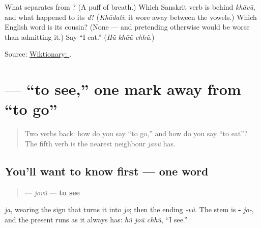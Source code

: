 \begin{tcolorbox}[breakable,colback=teal!4,colframe=teal!35!black,title={Before you move on}]
What separates \textbf{} from \textbf{}? (A puff of breath.) Which Sanskrit verb is behind \emph{khāvũ}, and what happened to its \emph{d}? (\emph{Khādati}; it wore away between the vowels.) Which English word is its cousin? (None — and pretending otherwise would be worse than admitting it.) Say \textquotedblleft{}I eat.\textquotedblright{} (\emph{Hũ khāũ chhũ}.)

Source: \href{https://en.wiktionary.org/wiki/\%E0\%AA\%96\%E0\%AA\%BE\%E0\%AA\%B5\%E0\%AB\%81\%E0\%AA\%82}{Wiktionary: }.
\end{tcolorbox}
\section[\texorpdfstring{\gu{જોવું} (jovũ)}{જોવું (jovũ)}]{ — \textquotedblleft{}to see,\textquotedblright{} one mark away from \textquotedblleft{}to go\textquotedblright{}}

\label{lesson:GU-C07-jovun}



\begin{quote}
Two verbs back: how do you say \textquotedblleft{}to go,\textquotedblright{} and how do you say \textquotedblleft{}to eat\textquotedblright{}? The fifth verb is the nearest neighbour \emph{javũ} has.
\end{quote}

\subsection*{You'll want to know first — one word}
\begin{quote}
\textbf{} — \emph{jovũ} — \textbf{to see}
\end{quote}

\textbf{} \emph{ja}, wearing the sign \textbf{} that turns it into \emph{jo}; then the ending \textbf{} \emph{-vũ}. The stem is \textbf{-} \emph{jo-}, and the present runs as it always has: \emph{hũ joũ chhũ}, \textquotedblleft{}I see.\textquotedblright{}

